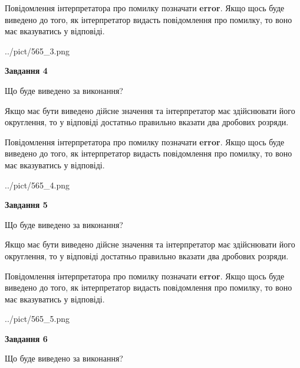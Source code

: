 \documentclass[12pt, ukrainian]{article}
\begin{document}
{\begin {Large}
Повідомлення інтерпретатора про помилку позначати \textbf{error}.
Якщо щось буде виведено до того, як інтерпретатор видасть повідомлення про помилку, 
то воно має вказуватись у відповіді. \par

\begin{center}
	{../pict/565_3.png}
\end{center}
\newpage

{\begin {center}\textbf{Завдання 4}\end {center}}\par
Що буде виведено за виконання? \par

Якщо має бути виведено дійсне значення та інтерпретатор має здійснювати його округлення, 
то у відповіді достатньо правильно вказати два дробових розряди.

Повідомлення інтерпретатора про помилку позначати \textbf{error}.
Якщо щось буде виведено до того, як інтерпретатор видасть повідомлення про помилку, 
то воно має вказуватись у відповіді. \par

\begin{center}
	{../pict/565_4.png}
\end{center}
\newpage

{\begin {center}\textbf{Завдання 5}\end {center}}\par
Що буде виведено за виконання? \par

Якщо має бути виведено дійсне значення та інтерпретатор має здійснювати його округлення, 
то у відповіді достатньо правильно вказати два дробових розряди.

Повідомлення інтерпретатора про помилку позначати \textbf{error}.
Якщо щось буде виведено до того, як інтерпретатор видасть повідомлення про помилку, 
то воно має вказуватись у відповіді. \par

\begin{center}
	{../pict/565_5.png}
\end{center}
\newpage

{\begin {center}\textbf{Завдання 6}\end {center}}\par
Що буде виведено за виконання? \par


\end{Large}}
\end{document}
